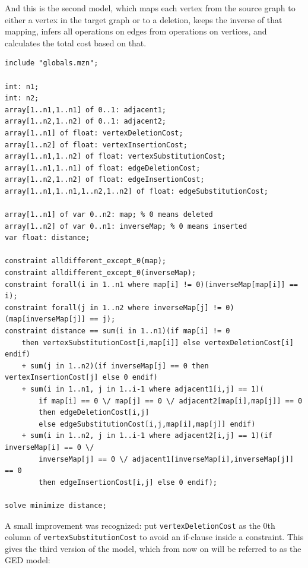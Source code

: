 \documentclass{article}
\theoremstyle{definition}
\begin{document}
And this is the second model, which maps each vertex from the source graph to either a vertex in the target graph or to a deletion, keeps the inverse of that mapping, infers all operations on edges from operations on vertices, and calculates the total cost based on that.
\begin{lstlisting}
include "globals.mzn";

int: n1;
int: n2;
array[1..n1,1..n1] of 0..1: adjacent1;
array[1..n2,1..n2] of 0..1: adjacent2;
array[1..n1] of float: vertexDeletionCost;
array[1..n2] of float: vertexInsertionCost;
array[1..n1,1..n2] of float: vertexSubstitutionCost;
array[1..n1,1..n1] of float: edgeDeletionCost;
array[1..n2,1..n2] of float: edgeInsertionCost;
array[1..n1,1..n1,1..n2,1..n2] of float: edgeSubstitutionCost;

array[1..n1] of var 0..n2: map; % 0 means deleted
array[1..n2] of var 0..n1: inverseMap; % 0 means inserted
var float: distance;

constraint alldifferent_except_0(map);
constraint alldifferent_except_0(inverseMap);
constraint forall(i in 1..n1 where map[i] != 0)(inverseMap[map[i]] == i);
constraint forall(j in 1..n2 where inverseMap[j] != 0)(map[inverseMap[j]] == j);
constraint distance == sum(i in 1..n1)(if map[i] != 0
    then vertexSubstitutionCost[i,map[i]] else vertexDeletionCost[i] endif)
    + sum(j in 1..n2)(if inverseMap[j] == 0 then vertexInsertionCost[j] else 0 endif)
    + sum(i in 1..n1, j in 1..i-1 where adjacent1[i,j] == 1)(
        if map[i] == 0 \/ map[j] == 0 \/ adjacent2[map[i],map[j]] == 0
        then edgeDeletionCost[i,j]
        else edgeSubstitutionCost[i,j,map[i],map[j]] endif)
    + sum(i in 1..n2, j in 1..i-1 where adjacent2[i,j] == 1)(if inverseMap[i] == 0 \/
        inverseMap[j] == 0 \/ adjacent1[inverseMap[i],inverseMap[j]] == 0
        then edgeInsertionCost[i,j] else 0 endif);

solve minimize distance;
\end{lstlisting}
A small improvement was recognized: put \texttt{vertexDeletionCost} as the 0th column of \texttt{vertexSubstitutionCost} to avoid an if-clause inside a constraint. This gives the third version of the model, which from now on will be referred to as the GED model:
\end{document}
